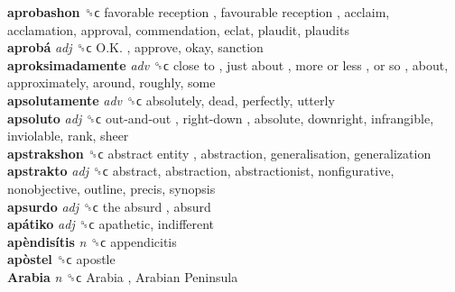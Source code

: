 \textbf{aprobashon} ␝ϲ   favorable reception ,  favourable reception , acclaim, acclamation, approval, commendation, eclat, plaudit, plaudits  \\
\textbf{aprobá} \emph{adj}  ␝ϲ   O.K. , approve, okay, sanction  \\
\textbf{aproksimadamente} \emph{adv}  ␝ϲ   close to ,  just about ,  more or less ,  or so , about, approximately, around, roughly, some  \\
\textbf{apsolutamente} \emph{adv}  ␝ϲ  absolutely, dead, perfectly, utterly  \\
\textbf{apsoluto} \emph{adj}  ␝ϲ   out-and-out ,  right-down , absolute, downright, infrangible, inviolable, rank, sheer  \\
\textbf{apstrakshon} ␝ϲ   abstract entity , abstraction, generalisation, generalization  \\
\textbf{apstrakto} \emph{adj}  ␝ϲ  abstract, abstraction, abstractionist, nonfigurative, nonobjective, outline, precis, synopsis  \\
\textbf{apsurdo} \emph{adj}  ␝ϲ   the absurd , absurd  \\
\textbf{apátiko} \emph{adj}  ␝ϲ  apathetic, indifferent  \\
\textbf{apèndisítis} \emph{n}  ␝ϲ  appendicitis  \\
\textbf{apòstel} ␝ϲ  apostle  \\
\textbf{Arabia} \emph{n}  ␝ϲ   Arabia ,  Arabian Peninsula   \\
